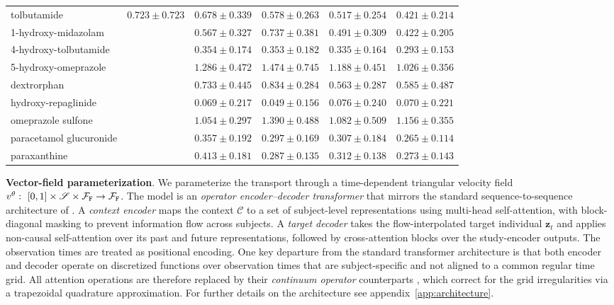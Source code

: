 \begin{table}[t]
\begin{tabularx}{\textwidth}{l YYYYY}
tolbutamide & $0.723 \pm 0.723$ & $0.678 \pm 0.339$ & $0.578 \pm 0.263$ & $0.517 \pm 0.254$ & $\mathbf{0.421 \pm 0.214}$ \\
1-hydroxy-midazolam &  & $0.567 \pm 0.327$ & $0.737 \pm 0.381$ & $0.491 \pm 0.309$ & $\mathbf{0.422 \pm 0.205}$ \\
4-hydroxy-tolbutamide &  & $0.354 \pm 0.174$ & $0.353 \pm 0.182$ & $0.335 \pm 0.164$ & $\mathbf{0.293 \pm 0.153}$ \\
5-hydroxy-omeprazole &  & $1.286 \pm 0.472$ & $1.474 \pm 0.745$ & $1.188 \pm 0.451$ & $\mathbf{1.026 \pm 0.356}$ \\
dextrorphan &  & $0.733 \pm 0.445$ & $0.834 \pm 0.284$ & $\mathbf{0.563 \pm 0.287}$ & $0.585 \pm 0.487$ \\
hydroxy-repaglinide &  & $0.069 \pm 0.217$ & $\mathbf{0.049 \pm 0.156}$ & $0.076 \pm 0.240$ & $0.070 \pm 0.221$ \\
omeprazole sulfone &  & $\mathbf{1.054 \pm 0.297}$ & $1.390 \pm 0.488$ & $1.082 \pm 0.509$ & $1.156 \pm 0.355$ \\
paracetamol glucuronide &  & $0.357 \pm 0.192$ & $0.297 \pm 0.169$ & $0.307 \pm 0.184$ & $\mathbf{0.265 \pm 0.114}$ \\
paraxanthine &  & $0.413 \pm 0.181$ & $0.287 \pm 0.135$ & $0.312 \pm 0.138$ & $\mathbf{0.273 \pm 0.143}$ \\
\bottomrule
\end{tabularx}
\end{table}

\textbf{Vector-field parameterization}.
%
We parameterize the transport through a time-dependent triangular velocity field $v^{\theta}:\ [0,1]\times \mathscr{S} \times \mathcal{F}_{{\tt F}} \to \mathcal{F}_{{\tt F}}$. The model is an \emph{operator encoder--decoder transformer} that mirrors the standard sequence-to-sequence architecture of \citep{vaswani2017attention}. A \emph{context encoder} maps the context $\mathscr{C}$ to a set of subject-level representations using multi-head self-attention, with block-diagonal masking to prevent information flow across subjects. A \emph{target decoder} takes the flow-interpolated target individual $\mathbf{z}_t$ and applies non-causal self-attention over its past and future representations, followed by cross-attention blocks over the study-encoder outputs. The observation times are treated as positional encoding. One key departure from the standard transformer architecture is that both encoder and decoder operate on discretized functions over observation times that are subject-specific and not aligned to a common regular time grid. All attention operations are therefore replaced by their \emph{continuum operator} counterparts \citep{calvello2024continuum}, which correct for the grid irregularities via a trapezoidal quadrature approximation. For further details on the architecture see appendix~\ref{app:architecture}.
 


